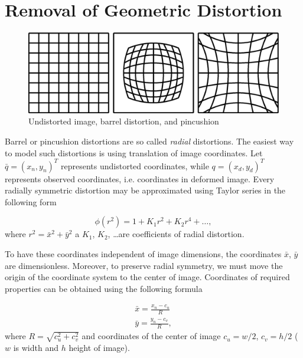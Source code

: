 \documentclass[12pt,titlepage]{article}
\begin{document}
\section*{Removal of Geometric Distortion}

\begin{figure}[h]
  \centering
  \includegraphics[width=150mm]{distortion_types.eps}
  \caption{Undistorted image, barrel distortion, and pincushion}
  \label{obr:druhy_zkresleni}
\end{figure}


Barrel or pincushion distortions are so called {\itshape radial} distortions. The easiest way to model such distortions is using translation of image coordinates.  Let $\bar{q} = ( x_n, y_n )^T$ represents undistorted coordinates, while $q = ( x_d, y_d )^T$ represents observed coordinates, i.e. coordinates in deformed image. Every radially symmetric distortion may be approximated using Taylor series in the following form

\begin{equation}
    \phi( r^2 ) = 1 + K_1 r^2 + K_2 r^4 + \dots,
\end{equation}
where $r^2 = \bar{x}^2 + \bar{y}^2$ a $K_1$, $K_2$, \dots are coefficients of radial distortion.

To have these coordinates independent of image dimensions, the coordinates $\bar{x}$, $\bar{y}$ are dimensionless. Moreover, to preserve radial symmetry, we must move the origin of the coordinate system to the center of image. Coordinates of required properties can be obtained using the following formula

\begin{equation}
    \label{bla1}
    \begin{array}{cc}
        \bar{x} = \frac{x_n - c_u}{R} \\
        \bar{y} = \frac{y_n - c_v}{R},
    \end{array}
\end{equation}
where $R = \sqrt{c_u^2 + c_v^2}$ and coordinates of the center of image $c_u = w / 2 $, $c_v = h / 2$ ($w$ is width and $h$ height of image).
\end{document}
